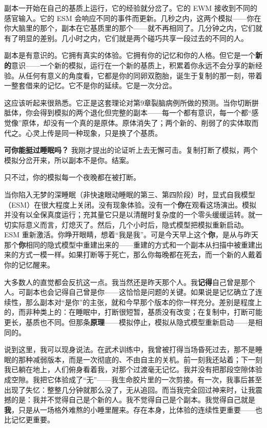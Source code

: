 \documentclass[11pt, twoside, openright]{book}
\begin{document}
副本一开始在自己的基质上运行，它的经验就分岔了。它的 EWM 接收到不同的感官输入。它的 ESM 会响应不同的事件而更新。几秒之内，这两个模拟------你在你大脑里的那个，副本在它基质里的那个------就不再相同了。几分钟之内，它们就有了明显的差别。几小时之内，它们就是两个碰巧共享一段过去的不同的人。

副本是有意识的。它拥有真实的体验。它拥有你的记忆和你的人格。但它是一个\textbf{新的}意识------一个新的模拟，运行在一个新的基质上，积累着你永远不会分享的新经验。从任何有意义的角度看，它都是你的同卵双胞胎，诞生于复制的那一刻，带着一整套借来的记忆。它不是你的延续。它是一次分岔。

这应该听起来很熟悉。它正是这套理论对第9章裂脑病例所做的预测。当你切断胼胝体，你会得到模拟的两个退化但完整的副本------每一个都有意识，每一个都“感觉像”原体，却没有一个真的是原体。原体消失了；两个新的、削弱了的实体取而代之。心灵上传是同一种现象，只是换了个基质。

\textbf{可你能挺过睡眠吗？} 我刚才提出的论证听上去无懈可击。复制打断了模拟，两个模拟分岔开来，所以副本不是你。结案。

只不过，你的模拟每一个夜晚都在被打断。

当你陷入无梦的深睡眠（非快速眼动睡眠的第三、第四阶段）时，显式自我模型（ESM）在很大程度上关闭。没有现象体验。没有一个\textbf{你}在观看这场演出。模拟并没有以全保真度运行；充其量它只是以清醒时复杂度的一个零头缓缓运转。就一切实际意义而言，灯熄灭了。然后，几个小时后，隐式模型把模拟重新启动。ESM 重新激活。你睁开眼睛，想着“我是我”。可是今天早上这个\textbf{你}，是从与昨天那个\textbf{你}相同的隐式模型中重建出来的------重建的方式和一个副本从扫描中被重建出来的方式一模一样。如果打断等于死亡，那么你每晚都在死去，而一个新的人戴着你的记忆醒来。

大多数人的直觉都会反抗这一点。我当然还是昨天那个人。我\textbf{记得}自己曾是那个人。可副本也会记得自己曾是你------这恰恰是问题的关键。如果说是记忆确立了连续性，那么副本对“是你”的主张，就和今早那个版本的你一样充分。差别是程度上的，而非种类上的：在睡眠中，打断很短暂，基质没有改变；在复制中，打断可能更长，基质也不同。但那条\textbf{原理}------模拟停止，模拟从隐式模型重新启动------是相同的。

说到这里，我可以现身说法。在武术训练中，我曾被打得当场昏死过去，那不是睡眠的那种减弱版本，而是一次彻底的、不由自主的关机。前一刻我还站着；下一刻我已躺在地上，人们俯身看着我，对那个过渡毫无记忆。我并没有把那段空隙体验成空隙。我把它体验成了“无”------我生命胶片里的一次剪接。有一次，我事后甚至出现了失忆：整整几分钟就那么没了，无从追回。而当我完全回过神来时，让我震撼的是：我并不觉得自己是个新的人。我不觉得自己是个副本。我觉得自己就是\textbf{我}，只是从一场格外难熬的小睡里醒来。存在本身，比体验的连续性更重要------也比记忆更重要。
\end{document}
